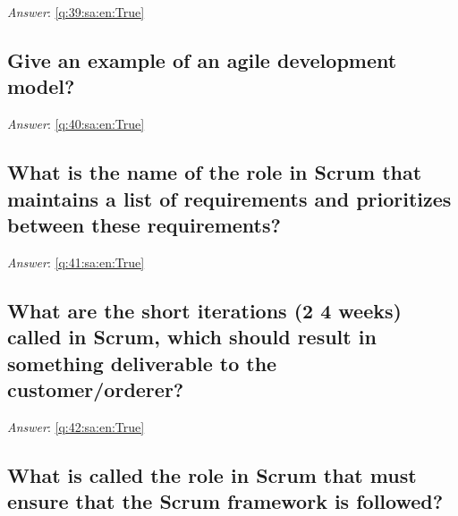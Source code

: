 \documentclass[a4paper,11pt,oneside]{article}
\begin{document}
\begin{sloppypar}
\textit{Answer}: \autoref{q:39:sa:en:True}



\subsection{Give an example of an agile development model?}

\label{q:40:sa:en:False}

\vspace{2cm}

\noindent\makebox[\textwidth]{\hrulefill}

\vspace{1cm}

\textit{Answer}: \autoref{q:40:sa:en:True}



\subsection{What is the name of the role in Scrum that maintains a list of requirements and prioritizes between these requirements?}

\label{q:41:sa:en:False}

\vspace{2cm}

\noindent\makebox[\textwidth]{\hrulefill}

\vspace{1cm}

\textit{Answer}: \autoref{q:41:sa:en:True}



\subsection{What are the short iterations (2 {\textendash} 4 weeks) called in Scrum, which should result in something deliverable to the customer/orderer?}

\label{q:42:sa:en:False}

\vspace{2cm}

\noindent\makebox[\textwidth]{\hrulefill}

\vspace{1cm}

\textit{Answer}: \autoref{q:42:sa:en:True}



\subsection{What is called the role in Scrum that must ensure that the Scrum framework is followed?}


\end{sloppypar}
\end{document}
